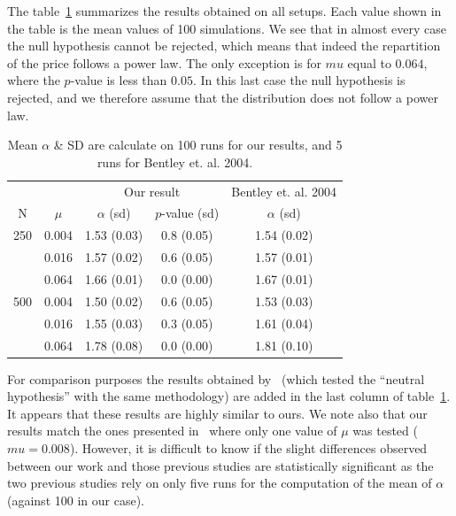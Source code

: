 \documentclass{wscpaperproc}
\newcommand{\memo}[2]{\textcolor{#1}{#2}}
\renewcommand{\memo}[2]{} %
\newcommand{\todo}[1]{\memo{red}{TODO: #1\\}}
\begin{document}

The table~\ref{tab:mualpha} summarizes the results obtained on all setups. Each value shown in the table is the mean values of 100 simulations. We see that in almost every case the null hypothesis cannot be rejected, which means that indeed the repartition of the price follows a power law. The only exception is for $mu$ equal to $0.064$, where the $p$-value is less than $0.05$. In this last case the null hypothesis is rejected, and we therefore assume that the distribution does not follow a power law.

\todo{complete table with final result (here it's just false exemple)}
\begin{table}[!h]
	\centering
	\begin{tabular}{cc|ccc}
		\multicolumn{2}{r}{}&\multicolumn{2}{c}{Our result}&\multicolumn{1}{c}{Bentley et. al. 2004}\\
			N&$\mu$ & $\alpha$ (sd) & $p$-value (sd) &$\alpha$ (sd)\\\hline
		250	&0.004&1.53 (0.03)&0.8 (0.05)&1.54 (0.02)\\
			&0.016&1.57 (0.02)&0.6 (0.05)&1.57 (0.01)\\
			&0.064&1.66 (0.01)&0.0 (0.00)&1.67 (0.01)\\\hline
		500	&0.004&1.50 (0.02)&0.6 (0.05)&1.53 (0.03)\\
			&0.016&1.55 (0.03)&0.3 (0.05)&1.61 (0.04)\\
			&0.064&1.78 (0.08)&0.0 (0.00)&1.81 (0.10)\\
	\end{tabular}
	\caption{Mean $\alpha$ \& SD are calculate on 100 runs for our results, and 5 runs for Bentley et. al. 2004.}
	\label{tab:mualpha}
\end{table}

For comparison purposes the results obtained by~\cite{bentley_random_2004} (which tested the ``neutral hypothesis'' with the same methodology) are added in the last column of table~\ref{tab:mualpha}. It appears that these results are highly similar to ours. We note also that our results match the ones presented in~\cite{mesoudi_random_2009} where only one value of $\mu$ was tested ($mu = 0.008$). However, it is difficult to know if the slight differences observed between our work and those previous studies are statistically significant as the two previous studies rely on only five runs for the computation of the mean of $\alpha$ (against 100 in our case).
\end{document}
